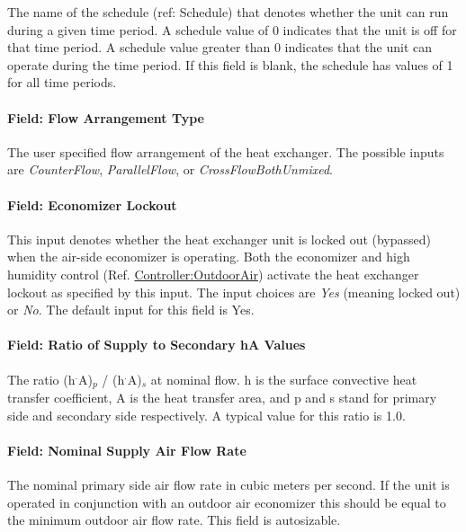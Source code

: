 The name of the schedule (ref: Schedule) that denotes whether the unit can run during a given time period. A schedule value of 0 indicates that the unit is off for that time period. A schedule value greater than 0 indicates that the unit can operate during the time period. If this field is blank, the schedule has values of 1 for all time periods.

\paragraph{Field: Flow Arrangement Type}\label{field-flow-arrangement-type}

The user specified flow arrangement of the heat exchanger. The possible inputs are \emph{CounterFlow}, \emph{ParallelFlow}, or \emph{CrossFlowBothUnmixed}.

\paragraph{Field: Economizer Lockout}\label{field-economizer-lockout}

This input denotes whether the heat exchanger unit is locked out (bypassed) when the air-side economizer is operating. Both the economizer and high humidity control (Ref. \hyperref[controlleroutdoorair]{Controller:OutdoorAir}) activate the heat exchanger lockout as specified by this input. The input choices are \emph{Yes} (meaning locked out) or \emph{No}. The default input for this field is Yes.

\paragraph{Field: Ratio of Supply to Secondary hA Values}\label{field-ratio-of-supply-to-secondary-ha-values}

The ratio (h\(^{.}\)A)\(_{p}\) / (h\(^{.}\)A)\(_{s}\) at nominal flow. h is the surface convective heat transfer coefficient, A is the heat transfer area, and p and s stand for primary side and secondary side respectively. A typical value for this ratio is 1.0.

\paragraph{Field: Nominal Supply Air Flow Rate}\label{field-nominal-supply-air-flow-rate}

The nominal primary side air flow rate in cubic meters per second. If the unit is operated in conjunction with an outdoor air economizer this should be equal to the minimum outdoor air flow rate. This field is autosizable.

